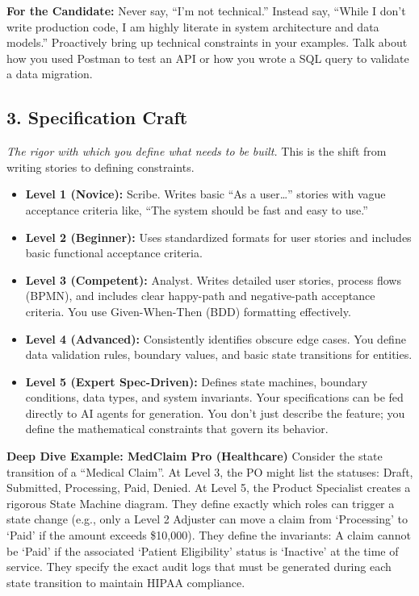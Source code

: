 \documentclass[
  11pt,
  openany,
  oneside]{book}
\providecommand{\tightlist}{%
  \setlength{\itemsep}{0pt}\setlength{\parskip}{0pt}}
\renewenvironment{quote}{\begin{customquote}}{\end{customquote}}
\begin{document}
\begin{quote}
\textbf{For the Candidate:} Never say, ``I'm not technical.'' Instead
say, ``While I don't write production code, I am highly literate in
system architecture and data models.'' Proactively bring up technical
constraints in your examples. Talk about how you used Postman to test an
API or how you wrote a SQL query to validate a data migration.
\end{quote}

\subsection{3. Specification Craft}\label{specification-craft}

\emph{The rigor with which you define what needs to be built.} This is
the shift from writing stories to defining constraints.

\begin{itemize}
\tightlist
\item
  \textbf{Level 1 (Novice):} Scribe. Writes basic ``As a user\ldots{}''
  stories with vague acceptance criteria like, ``The system should be
  fast and easy to use.''
\item
  \textbf{Level 2 (Beginner):} Uses standardized formats for user
  stories and includes basic functional acceptance criteria.
\item
  \textbf{Level 3 (Competent):} Analyst. Writes detailed user stories,
  process flows (BPMN), and includes clear happy-path and negative-path
  acceptance criteria. You use Given-When-Then (BDD) formatting
  effectively.
\item
  \textbf{Level 4 (Advanced):} Consistently identifies obscure edge
  cases. You define data validation rules, boundary values, and basic
  state transitions for entities.
\item
  \textbf{Level 5 (Expert Spec-Driven):} Defines state machines,
  boundary conditions, data types, and system invariants. Your
  specifications can be fed directly to AI agents for generation. You
  don't just describe the feature; you define the mathematical
  constraints that govern its behavior.
\end{itemize}

\textbf{Deep Dive Example: MedClaim Pro (Healthcare)} Consider the state
transition of a ``Medical Claim''. At Level 3, the PO might list the
statuses: Draft, Submitted, Processing, Paid, Denied. At Level 5, the
Product Specialist creates a rigorous State Machine diagram. They define
exactly which roles can trigger a state change (e.g., only a Level 2
Adjuster can move a claim from `Processing' to `Paid' if the amount
exceeds \$10,000). They define the invariants: A claim cannot be `Paid'
if the associated `Patient Eligibility' status is `Inactive' at the time
of service. They specify the exact audit logs that must be generated
during each state transition to maintain HIPAA compliance.
\end{document}
